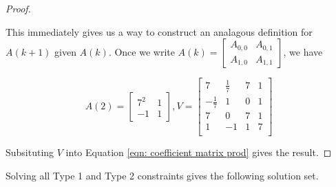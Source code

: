 \documentclass[12pt]{article}
\theoremstyle{plain}
\theoremstyle{definition}
\theoremstyle{remark}
\theoremstyle{definition}
\newcommand{\lablnode}[3]{\node[shape=circle,draw=none,fill=none, inner sep=0pt,minimum size=5pt] (A) at ( #1 , #2 ) {#3};}
\begin{document}
\begin{proof}
\begin{center}
\end{center}

This immediately gives us a way to construct an analagous definition for $A(k+1)$ given $A(k)$. Once we write $A(k) = \begin{bmatrix} A_{0,0} & A_{0,1} \\ A_{1,0} & A_{1,1} \end{bmatrix}$, we have

$$
A(2) = 
\begin{bmatrix}
    7^2 & 1 \\
    -1 & 1
\end{bmatrix},
V = 
\begin{bmatrix}
    7 & \frac{1}{7} & 7 & 1 \\
    -\frac{1}{7} & 1 & 0 & 1 \\
    7 & 0 & 7  & 1 \\
    1 & -1 & 1 & 7 \\
\end{bmatrix}
$$

Subsituting $V$ into Equation \ref{eqn: coefficient matrix prod} gives the result.

\end{proof}


Solving all Type 1 and Type 2 constraints gives the following solution set.
\end{document}

